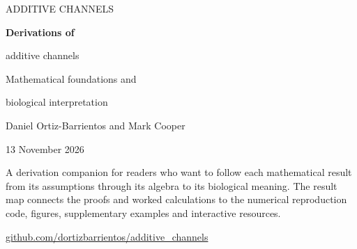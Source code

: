 \documentclass[11pt,a4paper,oneside]{report}
\numberwithin{equation}{chapter}
\theoremstyle{definition}
\theoremstyle{remark}
\begin{document}
\begin{titlepage}
\vspace*{15mm}
{\large\color{inkblue}ADDITIVE CHANNELS\par}
\vspace{9mm}
{\Huge\bfseries Derivations of\par additive channels\par}
\vspace{7mm}
{\Large Mathematical foundations and\par biological interpretation\par}
\vspace{14mm}
{\large Daniel Ortiz-Barrientos and Mark Cooper\par}
\vspace{6mm}
13 November 2026\par
\vfill
\begin{minipage}{0.93\textwidth}
A derivation companion for readers who want to follow each mathematical result from its assumptions through its algebra to its biological meaning. The result map connects the proofs and worked calculations to the numerical reproduction code, figures, supplementary examples and interactive resources.
\end{minipage}\par
\vspace{10mm}
\href{https://github.com/dortizbarrientos/additive_channels}{github.com/dortizbarrientos/additive\_channels}
\end{titlepage}

\tableofcontents
\clearpage
{}








\appendix


\clearpage
{}
{}


\end{document}
